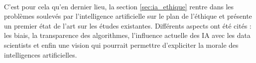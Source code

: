\documentclass[10pt, french, a4paper]{report}
\begin{document}
\paragraph{}
C’est pour cela qu’en dernier lieu, la section \ref{sec:ia_ethique} rentre dans les problèmes soulevés par l’intelligence artificielle sur le plan de l’éthique et présente un premier état de l’art sur les études existantes. Différents aspects ont été cités : les biais, la transparence des algorithmes, l’influence actuelle des IA avec les data scientists et enfin une vision qui pourrait permettre d’expliciter la morale des intelligences artificielles. 





\end{document}
